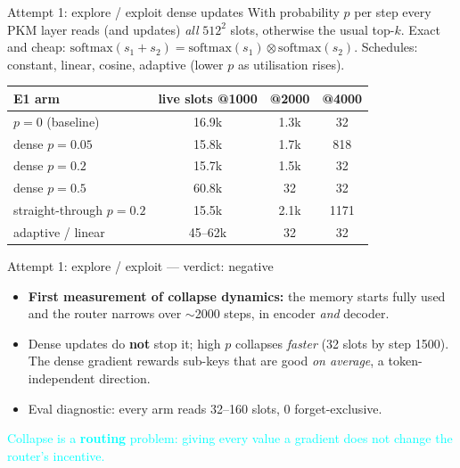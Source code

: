 \documentclass{beamer}
\newcommand{\pierre}[1]{\textcolor{cyan}{#1}}
\begin{document}
\begin{frame}{Attempt 1: explore / exploit dense updates}
With probability $p$ per step every PKM layer reads (and updates)
\emph{all} $512^2$ slots, otherwise the usual top-$k$. Exact and cheap:
$\text{softmax}(s_1{+}s_2) = \text{softmax}(s_1)\otimes\text{softmax}(s_2)$.
Schedules: constant, linear, cosine, adaptive (lower $p$ as utilisation rises).

\medskip
\begin{center}
\small
\begin{tabular}{|l|c|c|c|}
\hline
E1 arm & live slots @1000 & @2000 & @4000 \\
\hline
$p=0$ (baseline)         & 16.9k & 1.3k & \alert{32} \\
dense $p=0.05$           & 15.8k & 1.7k & 818 \\
dense $p=0.2$            & 15.7k & 1.5k & \alert{32} \\
dense $p=0.5$            & 60.8k & 32   & \alert{32} \\
straight-through $p=0.2$ & 15.5k & 2.1k & 1171 \\
adaptive / linear        & 45--62k & 32 & \alert{32} \\
\hline
\end{tabular}
\end{center}
\end{frame}

\begin{frame}{Attempt 1: explore / exploit --- verdict: negative}
\begin{itemize}
  \item \textbf{First measurement of collapse dynamics:} the memory starts fully
        used and the router narrows over $\sim$2000 steps, in encoder \emph{and}
        decoder.
  \item Dense updates do \textbf{not} stop it; high $p$ collapses
        \emph{faster} (32 slots by step 1500). The dense gradient rewards sub-keys
        that are good \emph{on average}, a token-independent direction.
  \item Eval diagnostic: every arm reads 32--160 slots, 0 forget-exclusive.
\end{itemize}

\medskip
\pierre{Collapse is a \textbf{routing} problem: giving every value a gradient does
not change the router's incentive.}
\end{frame}
\end{document}
